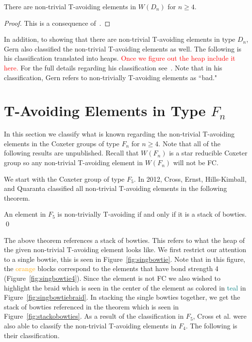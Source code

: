 \begin{theorem}
 There are non-trivial T-avoiding elements in $W(D_n)$ for $n \geq 4$.
\begin{proof}
	This is a consequence of~\cite[Section 2.2]{Gern2013a}.
\end{proof}
\end{theorem}

In addition, to showing that there are non-trivial T-avoiding elements in type $D_n$, Gern also classified the non-trivial T-avoiding elements as well. The following is his classification translated into heaps. \textcolor{red}{Once we figure out the heap include it here.} For the full details regarding his classification see~\cite{Gern2013a}. Note that in his classification, Gern  refers to non-trivially T-avoiding elements as ``bad."


\section{T-Avoiding Elements in Type $F_n$}

In this section we classify what is known regarding the non-trivial T-avoiding elements in the Coxeter groups of type $F_n$ for $n \geq 4$. Note that all of the following results are unpublished. Recall that $W(F_n)$ is a star reducible Coxeter group so any non-trivial T-avoiding element in $W(F_n)$ will not be FC.

We start with the Coxeter group of type $F_5$. In 2012, Cross, Ernst, Hills-Kimball, and Quaranta classified all non-trivial T-avoiding elements in the following theorem.

\begin{theorem}
An element in $F_5$ is non-trivially T-avoiding if and only if it is a stack of bowties. \qed	
\end{theorem}

The above theorem references a stack of bowties. This refers to what the heap of the given non-trivial T-avoiding element looks like. We first restrict our attention to a single bowtie, this is seen in Figure~\ref{fig:singbowtie}. Note that in this figure, the \textcolor{orange}{orange} blocks correspond to the elements that have bond strength 4 (Figure~\ref{fig:singbowtie4}). Since the element is not FC we also wished to highlight the braid which is seen in the center of the element as colored in \textcolor{teal}{teal} in Figure~\ref{fig:singbowtiebraid}. In stacking the single bowties together, we get the stack of bowties referenced in the theorem which is seen in Figure~\ref{fig:stackobowties}. As a result of the classification in $F_5$, Cross et al. were also able to classify the non-trivial T-avoiding elements in $F_4$. The following is their classification.

